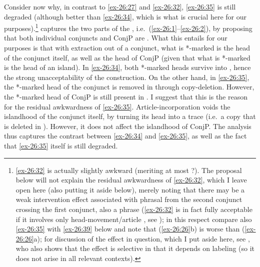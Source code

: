 \documentclass[output=paper]{langsci/langscibook}
\begin{document}
Consider now why, in contrast to \eqref{ex-26:27} and \eqref{ex-26:32}, \eqref{ex-26:35} is still degraded
(although better than \eqref{ex-26:34}, which is what is crucial here for our
purposes).\footnote{\eqref{ex-26:32} is actually slightly awkward (meriting at most ?).
    The proposal below will not explain the residual awkwardness of \eqref{ex-26:32}, which
    I leave open here (also putting it aside below), merely noting that there
    may be a weak intervention effect associated with phrasal  from the
    second conjunct crossing the first conjunct, also a phrase (\ref{ex-26:32} is in fact
    fully acceptable if it involves only head-movement/article ,
    see \citealt{Boskovic2013b}); in this respect compare also \eqref{ex-26:35} with \eqref{ex-26:39}
    below and note that (\ref{ex-26:26}b) is worse than (\ref{ex-26:26}a); for discussion of the effect
in question, which I put aside here, see \textcite{Boskovicinprep}, who also
shows that the effect is selective in that it depends on labeling (so it does
not arise in all relevant contexts).} \textcite{Oda:2017} captures the two
parts of the , i.e.\ (\ref{ex-26:1}--\ref{ex-26:2}), by proposing that both individual
conjuncts and ConjP are . What this entails for our purposes is that
with extraction out of a conjunct, what is *-marked is the head of the conjunct
itself, as well as the head of ConjP (given that what is *-marked is the head
of an island). In \eqref{ex-26:34}, both *-marked heads survive into
, hence the strong unacceptability of the construction. On the
other hand, in \eqref{ex-26:35}, the *-marked head of the conjunct is
removed in  through copy-deletion. However, the *-marked head
of ConjP is still present in . I suggest that this is the
reason for the residual awkwardness of \eqref{ex-26:35}.
Article-incorporation voids the islandhood of the conjunct itself, by turning
its head into a trace (i.e.\ a copy that is deleted in ).
However, it does not affect the islandhood of ConjP. The analysis
thus captures the contrast between \eqref{ex-26:34} and
\eqref{ex-26:35}, as well as the fact that \eqref{ex-26:35} itself is
still degraded.
\end{document}

